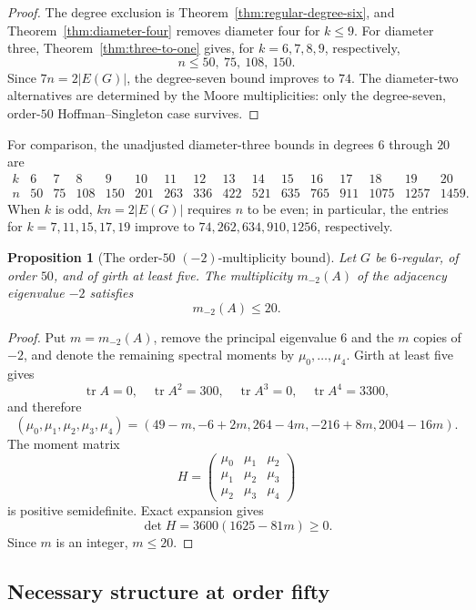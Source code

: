 \documentclass[a4paper,10pt,reqno]{amsart}
\theoremstyle{plain}
\newtheorem{proposition}[theorem]{Proposition}
\theoremstyle{definition}
\theoremstyle{remark}
\newcommand{\tr}{\operatorname{tr}}
\begin{document}
\begin{proof}
The degree exclusion is Theorem~\ref{thm:regular-degree-six}, and
Theorem~\ref{thm:diameter-four} removes diameter four for \(k\le9\).
 For diameter three, Theorem~\ref{thm:three-to-one} gives, for
\(k=6,7,8,9\), respectively,
\[
 n\le50,\ 75,\ 108,\ 150.
\]
Since \(7n=2|E(G)|\), the degree-seven bound improves to \(74\).  The
diameter-two alternatives are determined by the Moore multiplicities: only
the degree-seven, order-\(50\) Hoffman--Singleton case survives.
\end{proof}

For comparison, the unadjusted diameter-three bounds in degrees \(6\) through
\(20\) are
\[
\begin{array}{c|rrrrrrrrrrrrrrr}
 k&6&7&8&9&10&11&12&13&14&15&16&17&18&19&20\\
 \hline
 n&50&75&108&150&201&263&336&422&521&635&765&911&1075&1257&1459.
\end{array}
\]
When \(k\) is odd, \(kn=2|E(G)|\) requires \(n\) to be even; in particular,
the entries for \(k=7,11,15,17,19\) improve to
\(74,262,634,910,1256\), respectively.

\begin{proposition}[The order-\(50\) \((-2)\)-multiplicity bound]
\label{prop:order50-minus-two}
Let \(G\) be \(6\)-regular, of order \(50\), and of girth at least five.
The multiplicity \(m_{-2}(A)\) of the adjacency eigenvalue \(-2\) satisfies
\[
 m_{-2}(A)\le20.
\]
\end{proposition}

\begin{proof}
Put \(m=m_{-2}(A)\), remove the principal eigenvalue \(6\) and the \(m\)
copies of \(-2\), and denote the remaining spectral moments by
\(\mu_0,\ldots,\mu_4\).  Girth at least five gives
\[
 \tr A=0,\quad \tr A^2=300,\quad \tr A^3=0,\quad \tr A^4=3300,
\]
and therefore
\[
 (\mu_0,\mu_1,\mu_2,\mu_3,\mu_4)
 =(49-m,-6+2m,264-4m,-216+8m,2004-16m).
\]
The moment matrix
\[
 H=\begin{pmatrix}
 \mu_0&\mu_1&\mu_2\\
 \mu_1&\mu_2&\mu_3\\
 \mu_2&\mu_3&\mu_4
 \end{pmatrix}
\]
is positive semidefinite.  Exact expansion gives
\[
 \det H=3600(1625-81m)\ge0.
\]
Since \(m\) is an integer, \(m\le20\).
\end{proof}

\subsection{Necessary structure at order fifty}
\end{document}
